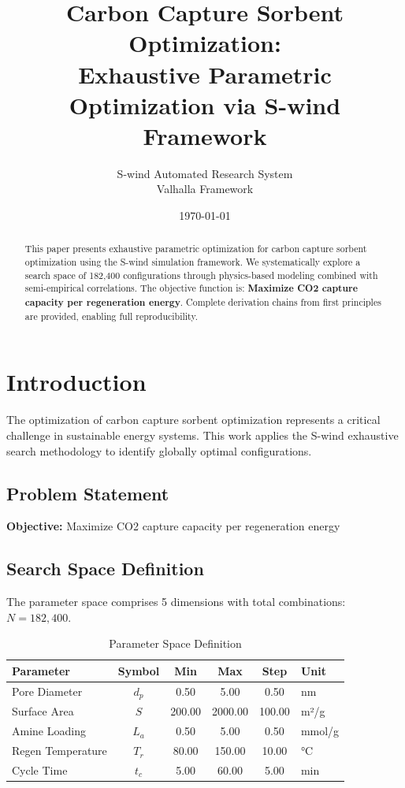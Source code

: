\documentclass[11pt,twocolumn]{article}
\title{Carbon Capture Sorbent Optimization: \\Exhaustive Parametric Optimization via S-wind Framework}
\author{S-wind Automated Research System\\Valhalla Framework}
\date{\today}
\begin{document}
\maketitle

\begin{abstract}
This paper presents exhaustive parametric optimization for carbon capture sorbent optimization using the S-wind simulation framework.
We systematically explore a search space of 182,400 configurations through physics-based modeling
combined with semi-empirical correlations. The objective function is: \textbf{Maximize CO2 capture capacity per regeneration energy}.
Complete derivation chains from first principles are provided, enabling full reproducibility.
\end{abstract}

\section{Introduction}
The optimization of carbon capture sorbent optimization represents a critical challenge in sustainable energy systems.
This work applies the S-wind exhaustive search methodology to identify globally optimal configurations.

\subsection{Problem Statement}
\textbf{Objective:} Maximize CO2 capture capacity per regeneration energy

\subsection{Search Space Definition}
The parameter space comprises 5 dimensions with total combinations: $N = 182,400$.

\begin{table}[h]
\centering
\caption{Parameter Space Definition}
\begin{tabular}{@{}lccccl@{}}
\toprule
Parameter & Symbol & Min & Max & Step & Unit \\
\midrule
Pore Diameter & $d_p$ & 0.50 & 5.00 & 0.50 & nm \\
Surface Area & $S$ & 200.00 & 2000.00 & 100.00 & m²/g \\
Amine Loading & $L_a$ & 0.50 & 5.00 & 0.50 & mmol/g \\
Regen Temperature & $T_r$ & 80.00 & 150.00 & 10.00 & °C \\
Cycle Time & $t_c$ & 5.00 & 60.00 & 5.00 & min \\
\bottomrule
\end{tabular}
\end{table}
\end{document}
